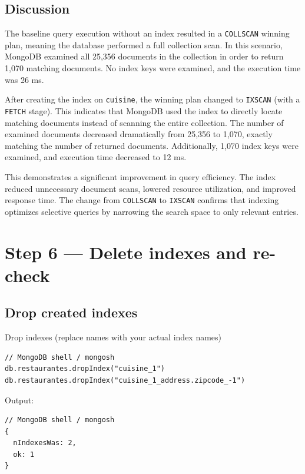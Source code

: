 \documentclass[11pt, letterpaper]{article}
\begin{document}
\subsection{Discussion}
The baseline query execution without an index resulted in a \texttt{COLLSCAN} winning plan, meaning the database performed a full collection scan. In this scenario, MongoDB examined all 25,356 documents in the collection in order to return 1,070 matching documents. No index keys were examined, and the execution time was 26 ms.

After creating the index on \texttt{cuisine}, the winning plan changed to \texttt{IXSCAN} (with a \texttt{FETCH} stage). This indicates that MongoDB used the index to directly locate matching documents instead of scanning the entire collection. The number of examined documents decreased dramatically from 25,356 to 1,070, exactly matching the number of returned documents. Additionally, 1,070 index keys were examined, and execution time decreased to 12 ms.

This demonstrates a significant improvement in query efficiency. The index reduced unnecessary document scans, lowered resource utilization, and improved response time. The change from \texttt{COLLSCAN} to \texttt{IXSCAN} confirms that indexing optimizes selective queries by narrowing the search space to only relevant entries.

\vspace{2.2cm}

\section{Step 6 — Delete indexes and re-check}
\subsection{Drop created indexes}
\begin{labstep}{Drop indexes (replace names with your actual index names)}
\begin{lstlisting}
// MongoDB shell / mongosh
db.restaurantes.dropIndex("cuisine_1")
db.restaurantes.dropIndex("cuisine_1_address.zipcode_-1")
\end{lstlisting}
\end{labstep}

\begin{labstep}{Output:}
\begin{lstlisting}
// MongoDB shell / mongosh
{
  nIndexesWas: 2,
  ok: 1
}
\end{lstlisting}
\end{labstep}
\end{document}
